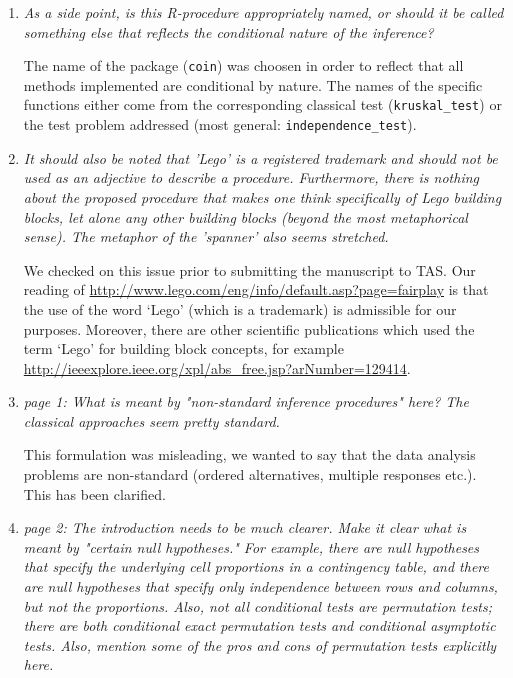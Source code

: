 \documentclass[11pt]{article}
\begin{document}
\begin{enumerate}
\item \textsl{As a side point, is this R-procedure appropriately named, or should it be called 
              something else that reflects the conditional nature of the inference?}

The name of the package (\texttt{coin}) was choosen in order to reflect that
all methods implemented are conditional by nature. The names of the specific
functions either come from the corresponding classical test
(\texttt{kruskal\_test}) or the test problem addressed (most general:
\texttt{independence\_test}).

\item \textsl{It should also be noted that 'Lego' is a registered trademark and should not be used 
              as an adjective to describe a procedure. Furthermore, there is nothing about the 
              proposed procedure that makes one think specifically of Lego building blocks, 
              let alone any other building blocks (beyond the most metaphorical sense). The 
              metaphor of the 'spanner' also seems stretched.}

We checked on this issue prior to submitting the manuscript to TAS. Our
reading of \url{http://www.lego.com/eng/info/default.asp?page=fairplay} is
that the use of the word `Lego' (which is a trademark) is admissible for our
purposes. Moreover, there are other scientific publications which used the
term `Lego' for building block concepts, for example
\url{http://ieeexplore.ieee.org/xpl/abs_free.jsp?arNumber=129414}.

\item \textsl{page 1:  What is meant by "non-standard inference procedures" here? The classical 
              approaches seem pretty standard.}

This formulation was misleading, we wanted to say that the data analysis
problems are non-standard (ordered alternatives, multiple responses etc.).
This has been clarified.

\item \textsl{page 2:  The introduction needs to be much clearer. Make it clear what is meant by 
              "certain null hypotheses." For example, there are null hypotheses that specify the 
              underlying cell proportions in a contingency table, and there are null hypotheses 
              that specify only independence between rows and columns, but not the proportions. 
              Also, not all conditional tests are permutation tests; there are both conditional 
              exact permutation tests and conditional asymptotic tests. Also, mention some of 
              the pros and cons of permutation tests explicitly here.}


\end{enumerate}
\end{document}
